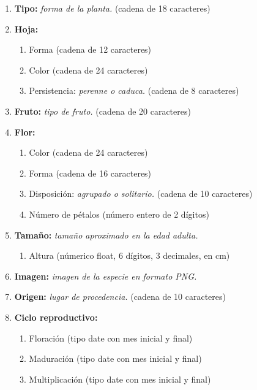 \documentclass[10pt,a4paper]{article}
\begin{document}
\begin{enumerate}[label={RD\arabic*.} ,leftmargin=2.8\parindent]
\begin{enumerate}[label={RD4.\arabic*.}]
	\item 
		\textbf{Tipo:} \textit{forma de la planta.} (cadena de 18 caracteres)

	\medskip
	\item
		\textbf{Hoja:}
	\begin{enumerate}[label=-]
		\item Forma (cadena de 12 caracteres)
		\item Color (cadena de 24 caracteres)
		\item Persistencia: \textit{perenne o caduca.} (cadena de 8 caracteres)
	\end{enumerate}

	\medskip	
	\item
		\textbf{Fruto:} \textit{tipo de fruto.} (cadena de 20 caracteres)

	\medskip
	\item
		\textbf{Flor:}
	\begin{enumerate} [label=-]
		\item Color (cadena de 24 caracteres)
		\item Forma (cadena de 16 caracteres)
		\item Disposición: \textit{agrupado o solitario.} (cadena de 10 caracteres)
		\item Número de pétalos (número entero de 2 dígitos)
	\end{enumerate}

	\medskip
	\item
		\textbf{Tamaño:} \textit{tamaño aproximado en la edad adulta.}
	\begin{enumerate}[label=-]
		\item Altura (númerico float, 6 dígitos, 3 decimales, en cm)
	\end{enumerate}
	
	\medskip	
	\item
		\textbf{Imagen:} \textit{imagen de la especie en formato PNG.}

	\medskip 
	\item
		\textbf{Origen:} \textit{lugar de procedencia.} (cadena de 10 caracteres)
		
	\medskip 
	\item
		\textbf{Ciclo reproductivo:}
	\begin{enumerate} [label=-]
		\item Floración (tipo date con mes inicial y final)
		\item Maduración (tipo date con mes inicial y final)
		\item Multiplicación (tipo date con mes inicial y final)
	\end{enumerate}
		\end{enumerate}
	

\end{enumerate}
\end{document}
